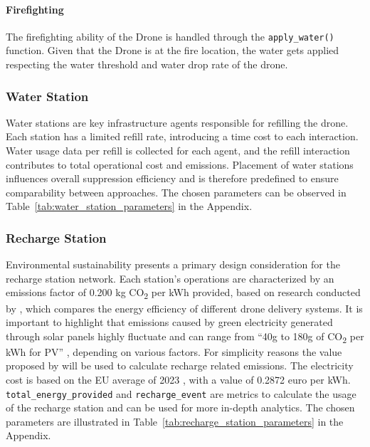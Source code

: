 \documentclass[11pt, a4paper]{article}
\begin{document}
\paragraph{Firefighting} The firefighting ability of the Drone is handled through the \texttt{apply\_water()} function. Given that the Drone is at the fire location, the water gets applied respecting the water threshold and water drop rate of the drone.

\subsubsection{Water Station}
\label{sec:WaterStation}
Water stations are key infrastructure agents responsible for refilling the drone. Each station has a limited refill rate, introducing a time cost to each interaction. Water usage data per refill is collected for each agent, and the refill interaction contributes to total operational cost and emissions. Placement of water stations influences overall suppression efficiency and is therefore predefined to ensure comparability between approaches. The chosen parameters can be observed in Table~\ref{tab:water_station_parameters} in the Appendix.

\subsubsection{Recharge Station}
\label{sec:RechargeStation}
Environmental sustainability presents a primary design consideration for the recharge station network. Each station's operations are characterized by an emissions factor of 0.200 kg CO\textsubscript{2} per kWh provided, based on research conducted by \citet*{stolaroffEnergyUseLife2018}, which compares the energy efficiency of different drone delivery systems. It is important to highlight that emissions caused by green electricity generated through solar panels highly fluctuate and can range from ``40g to 180g of CO\textsubscript{2} per kWh for PV'' \citep{GreenhousegasEmissionsSolar2007}, depending on various factors. For simplicity reasons the value proposed by  \citet*{stolaroffEnergyUseLife2018} will be used to calculate recharge related emissions. The electricity cost is based on the EU average of 2023 \citep{ElectricityPriceStatistics}, with a value of 0.2872 euro per kWh. \texttt{total\_energy\_provided} and \texttt{recharge\_event} are metrics to calculate the usage of the recharge station and can be used for more in-depth analytics. The chosen parameters are illustrated in Table~\ref{tab:recharge_station_parameters} in the Appendix.
\end{document}
